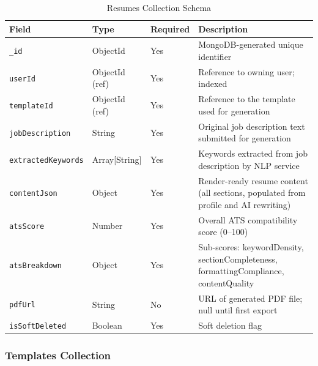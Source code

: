 \documentclass[12pt, a4paper, oneside]{report}
\begin{document}
\begin{table}[H]
\centering
\caption{Resumes Collection Schema}
\label{tab:schema_resumes}
\renewcommand{\arraystretch}{1.4}
\begin{tabularx}{\textwidth}{|p{3.5cm}|p{2.5cm}|p{1.5cm}|X|}
\hline
\textbf{Field} & \textbf{Type} & \textbf{Required} & \textbf{Description} \\
\hline
\texttt{\_id} & ObjectId & Yes & MongoDB-generated unique identifier \\
\hline
\texttt{userId} & ObjectId (ref) & Yes & Reference to owning user; indexed \\
\hline
\texttt{templateId} & ObjectId (ref) & Yes & Reference to the template used for generation \\
\hline
\texttt{jobDescription} & String & Yes & Original job description text submitted for generation \\
\hline
\texttt{extractedKeywords} & Array[String] & Yes & Keywords extracted from job description by NLP service \\
\hline
\texttt{contentJson} & Object & Yes & Render-ready resume content (all sections, populated from profile and AI rewriting) \\
\hline
\texttt{atsScore} & Number & Yes & Overall ATS compatibility score (0--100) \cite{jobscan2021} \\
\hline
\texttt{atsBreakdown} & Object & Yes & Sub-scores: keywordDensity, sectionCompleteness, formattingCompliance, contentQuality \\
\hline
\texttt{pdfUrl} & String & No & URL of generated PDF file; null until first export \\
\hline
\texttt{isSoftDeleted} & Boolean & Yes & Soft deletion flag \\
\hline
\end{tabularx}
\end{table}

\subsubsection{Templates Collection}
\end{document}
